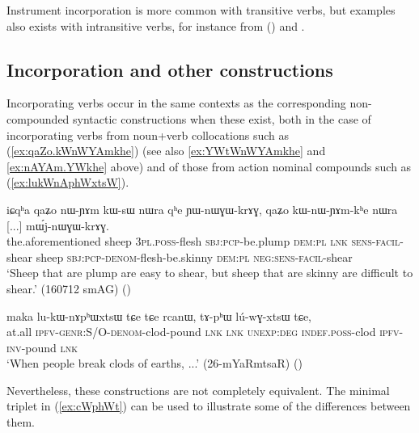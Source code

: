 Instrument incorporation is more common with transitive verbs, but examples also exists with intransitive verbs, for instance  from  () and .


\subsection{Incorporation and other constructions} \label{sec:incorp.vs.other}
Incorporating verbs occur in the same contexts as the corresponding non-com\-poun\-ded syntactic constructions when these exist, both in the case of incorporating verbs from noun+verb collocations such as  (\ref{ex:qaZo.kWnWYAmkhe}) (see also \ref{ex:YWtWnWYAmkhe} and \ref{ex:nAYAm.YWkhe} above) and of those from action nominal compounds such as  (\ref{ex:lukWnAphWxtsW}).

\begin{exe}
\ex \label{ex:qaZo.kWnWYAmkhe}
\gll iɕqʰa qaʑo nɯ-ɲɤm kɯ-sɯ nɯra qʰe ɲɯ-nɯɣɯ-krɤɣ, qaʑo kɯ-nɯ-ɲɤm-kʰe nɯra [...] mɯ́j-nɯɣɯ-krɤɣ. \\
the.aforementioned sheep \textsc{3pl}.\textsc{poss}-flesh \textsc{sbj}:\textsc{pcp}-be.plump \textsc{dem}:\textsc{pl} \textsc{lnk} \textsc{sens}-\textsc{facil}-shear sheep \textsc{sbj}:\textsc{pcp}-\textsc{denom}-flesh-be.skinny \textsc{dem}:\textsc{pl} {  } \textsc{neg}:\textsc{sens}-\textsc{facil}-shear \\
\glt `Sheep that are plump are easy to shear, but sheep that are skinny are difficult to shear.' (160712 smAG)
()
\end{exe}

\begin{exe}
\ex \label{ex:lukWnAphWxtsW}
\gll maka lu-kɯ-nɤpʰɯxtsɯ tɕe tɕe rcanɯ, tɤ-pʰɯ lú-wɣ-xtsɯ tɕe, \\
at.all \textsc{ipfv}-\textsc{genr}:S/O-\textsc{denom}-clod-pound \textsc{lnk} \textsc{lnk} \textsc{unexp}:\textsc{deg} \textsc{indef}.\textsc{poss}-clod \textsc{ipfv}-\textsc{inv}-pound \textsc{lnk} \\
\glt `When people break clods of earths, ...' (26-mYaRmtsaR)
()
\end{exe}

Nevertheless, these constructions are not completely equivalent. The minimal triplet in (\ref{ex:cWphWt}) can be used to illustrate some of the differences between them.

